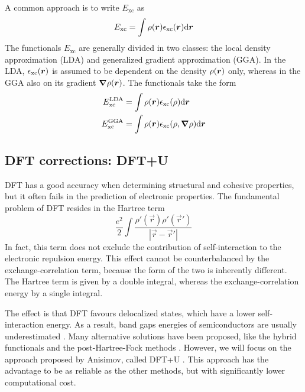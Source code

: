 A common approach is to write $E_\text{xc}$ as
\begin{equation}
    E_\text{xc} = \int \rr{\rho} \rr{\epsilon_\text{xc}} \dr
\end{equation}
The functionals $E_\text{xc}$ are generally divided in two classes: the local density approximation (LDA) and generalized gradient approximation (GGA). In the LDA, $\epsilon_\text{xc}(\mathbf{\boldsymbol{r}})$ is assumed to be dependent on the density $\rho(\mathbf{\boldsymbol{r}})$ only, whereas in the GGA also on its gradient $\grad \rho(\mathbf{\boldsymbol{r}})$. The functionals take the form
\begin{align}
    E_\text{xc}^\text{LDA} & = \int \rr{\rho} \epsilon_\text{xc}(\rho) \dr             \\
    E_\text{xc}^\text{GGA} & = \int \rr{\rho} \epsilon_\text{xc}(\rho, \grad \rho) \dr
\end{align}

\subsection{DFT corrections: DFT+U}
\label{sec:dft+u}
DFT has a good accuracy when determining structural and cohesive properties, but it often fails in the prediction of electronic properties. The fundamental problem of DFT resides in the Hartree term
\begin{equation}
    \frac{e^2}{2} \int \frac{\rho'(\vec{r})\rho'(\vec{r}')}{|\vec{r}-\vec{r}'|}
\end{equation}
In fact, this term does not exclude the contribution of self-interaction to the electronic repulsion energy. This effect cannot be counterbalanced by the exchange-correlation term, because the form of the two is inherently different. The Hartree term is given by a double integral, whereas the exchange-correlation energy by a single integral.

The effect is that DFT favours delocalized states, which have a lower self-interaction energy. As a result, band gaps energies of semiconductors are usually underestimated \cite{seidl1996}. Many alternative solutions have been proposed, like the hybrid functionals and the post-Hartree-Fock methods \cite{tolba2018}. However, we will focus on the approach proposed by Anisimov, called DFT+U \cite{anisimov1991}. This approach has the advantage to be as reliable as the other methods, but with significantly lower computational cost.

